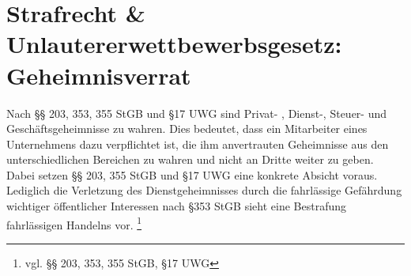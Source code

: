 \section{Strafrecht \& Unlautererwettbewerbsgesetz: Geheimnisverrat}
Nach §§ 203, 353, 355 StGB und §17 UWG sind Privat- , Dienst-, Steuer- und Gesch\"aftsgeheimnisse zu wahren. Dies bedeutet, dass ein Mitarbeiter eines Unternehmens dazu verpflichtet ist, die ihm anvertrauten Geheimnisse aus den unterschiedlichen Bereichen zu wahren und nicht an Dritte weiter zu geben. Dabei setzen §§ 203, 355 StGB und §17 UWG eine konkrete Absicht voraus. Lediglich die Verletzung des Dienstgeheimnisses durch die fahrl\"assige Gef\"ahrdung wichtiger \"offentlicher Interessen nach §353 StGB sieht eine Bestrafung fahrl\"assigen Handelns vor. \footnote{vgl. §§ 203, 353, 355 StGB, §17 UWG}
 \label{strafrecht_u_unlautererwettbewerbsgesetz_geheimnisverrat}

  